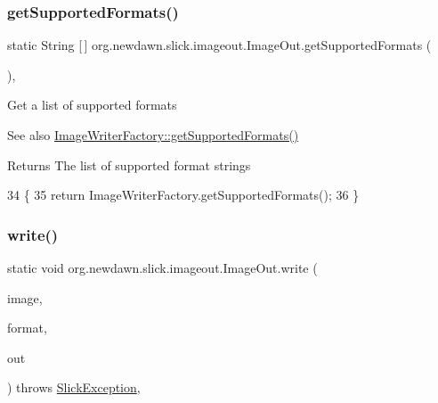 \subsubsection{\texorpdfstring{get\+Supported\+Formats()}{getSupportedFormats()}}
{\footnotesize\ttfamily static String \mbox{[}$\,$\mbox{]} org.\+newdawn.\+slick.\+imageout.\+Image\+Out.\+get\+Supported\+Formats (\begin{DoxyParamCaption}{ }\end{DoxyParamCaption})\hspace{0.3cm}{\ttfamily [inline]}, {\ttfamily [static]}}

Get a list of supported formats

\begin{DoxySeeAlso}{See also}
\mbox{\hyperlink{classorg_1_1newdawn_1_1slick_1_1imageout_1_1_image_writer_factory_a582dd022e333ee816d486158729f226a}{Image\+Writer\+Factory\+::get\+Supported\+Formats()}} 
\end{DoxySeeAlso}
\begin{DoxyReturn}{Returns}
The list of supported format strings 
\end{DoxyReturn}

\begin{DoxyCode}
34                                                  \{
35         \textcolor{keywordflow}{return} ImageWriterFactory.getSupportedFormats();
36     \}
\end{DoxyCode}
\mbox{\label{classorg_1_1newdawn_1_1slick_1_1imageout_1_1_image_out_a3b5d59b0d7fbacc07f04a2e3c687cd74}} 
\subsubsection{\texorpdfstring{write()}{write()}\hspace{0.1cm}{\footnotesize\ttfamily [1/6]}}
{\footnotesize\ttfamily static void org.\+newdawn.\+slick.\+imageout.\+Image\+Out.\+write (\begin{DoxyParamCaption}\item[{\mbox{\hyperlink{classorg_1_1newdawn_1_1slick_1_1_image}{Image}}}]{image,  }\item[{String}]{format,  }\item[{Output\+Stream}]{out }\end{DoxyParamCaption}) throws \mbox{\hyperlink{classorg_1_1newdawn_1_1slick_1_1_slick_exception}{Slick\+Exception}}\hspace{0.3cm}{\ttfamily [inline]}, {\ttfamily [static]}}

